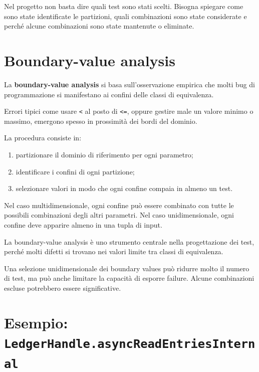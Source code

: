 \begin{notaesame}
Nel progetto non basta dire quali test sono stati scelti. Bisogna spiegare come sono state identificate le partizioni, quali combinazioni sono state considerate e perché alcune combinazioni sono state mantenute o eliminate.
\end{notaesame}

\section{Boundary-value analysis}

La \textbf{boundary-value analysis} si basa sull'osservazione empirica che molti bug di programmazione si manifestano ai confini delle classi di equivalenza.

Errori tipici come usare \texttt{<} al posto di \texttt{<=}, oppure gestire male un valore minimo o massimo, emergono spesso in prossimità dei bordi del dominio.

La procedura consiste in:

\begin{enumerate}
    \item partizionare il dominio di riferimento per ogni parametro;
    \item identificare i confini di ogni partizione;
    \item selezionare valori in modo che ogni confine compaia in almeno un test.
\end{enumerate}

Nel caso multidimensionale, ogni confine può essere combinato con tutte le possibili combinazioni degli altri parametri. Nel caso unidimensionale, ogni confine deve apparire almeno in una tupla di input.

\begin{notaesame}
La boundary-value analysis è uno strumento centrale nella progettazione dei test, perché molti difetti si trovano nei valori limite tra classi di equivalenza.
\end{notaesame}

\begin{notaesame}
Una selezione unidimensionale dei boundary values può ridurre molto il numero di test, ma può anche limitare la capacità di esporre failure. Alcune combinazioni escluse potrebbero essere significative.
\end{notaesame}

\section{Esempio: \texttt{LedgerHandle.asyncReadEntriesInternal}}

